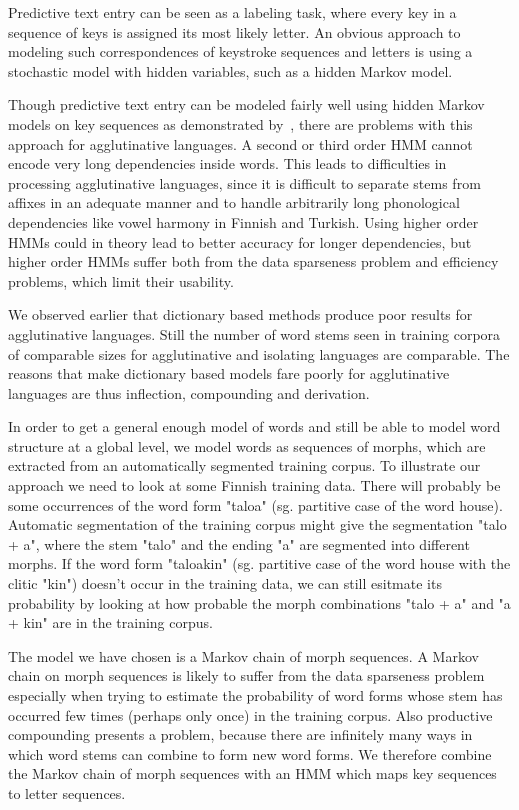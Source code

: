 \documentclass{llncs}
\begin{document}
Predictive text entry can be seen as a labeling task, where every key
in a sequence of keys is assigned its most likely letter. An obvious
approach to modeling such correspondences of keystroke sequences and
letters is using a stochastic model with hidden variables, such as a
hidden Markov model.

Though predictive text entry can be modeled fairly well using hidden
Markov models on key sequences as demonstrated by~\cite{Tantug:2010},
there are problems with this approach for agglutinative languages. A
second or third order HMM cannot encode very long dependencies inside
words. This leads to difficulties in processing agglutinative
languages, since it is difficult to separate stems from affixes in an
adequate manner and to handle arbitrarily long phonological
dependencies like vowel harmony in Finnish and Turkish. Using higher
order HMMs could in theory lead to better accuracy for longer
dependencies, but higher order HMMs suffer both from the data
sparseness problem and efficiency problems, which limit their
usability.

We observed earlier that dictionary based methods produce poor results
for agglutinative languages. Still the number of word stems seen in
training corpora of comparable sizes for agglutinative and isolating
languages are comparable. The reasons that make dictionary based
models fare poorly for agglutinative languages are thus inflection,
compounding and derivation. 

In order to get a general enough model of words and still be able to
model word structure at a global level, we model words as sequences of
morphs, which are extracted from an automatically segmented training
corpus. To illustrate our approach we need to look at some Finnish
training data. There will probably be some occurrences of the word
form "taloa" (sg. partitive case of the word house). Automatic
segmentation of the training corpus might give the segmentation "talo
+ a", where the stem "talo" and the ending "a" are segmented into
different morphs. If the word form "taloakin" (sg. partitive case of
the word house with the clitic "kin") doesn't occur in the training
data, we can still esitmate its probability by looking at how probable
the morph combinations "talo + a" and "a + kin" are in the training
corpus.

The model we have chosen is a Markov chain of morph sequences. A
Markov chain on morph sequences is likely to suffer from the data
sparseness problem especially when trying to estimate the probability
of word forms whose stem has occurred few times (perhaps only once) in
the training corpus. Also productive compounding presents a problem,
because there are infinitely many ways in which word stems can combine
to form new word forms. We therefore combine the Markov chain of morph
sequences with an HMM which maps key sequences to letter sequences.
\end{document}

